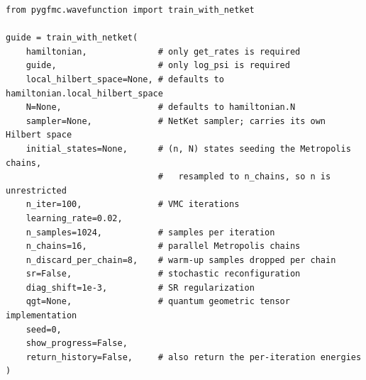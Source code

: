 \documentclass{SciPost}
\begin{document}
\begin{lstlisting}
from pygfmc.wavefunction import train_with_netket

guide = train_with_netket(
    hamiltonian,              # only get_rates is required
    guide,                    # only log_psi is required
    local_hilbert_space=None, # defaults to hamiltonian.local_hilbert_space
    N=None,                   # defaults to hamiltonian.N
    sampler=None,             # NetKet sampler; carries its own Hilbert space
    initial_states=None,      # (n, N) states seeding the Metropolis chains,
                              #   resampled to n_chains, so n is unrestricted
    n_iter=100,               # VMC iterations
    learning_rate=0.02,
    n_samples=1024,           # samples per iteration
    n_chains=16,              # parallel Metropolis chains
    n_discard_per_chain=8,    # warm-up samples dropped per chain
    sr=False,                 # stochastic reconfiguration
    diag_shift=1e-3,          # SR regularization
    qgt=None,                 # quantum geometric tensor implementation
    seed=0,
    show_progress=False,
    return_history=False,     # also return the per-iteration energies
)
\end{lstlisting}
\end{document}
